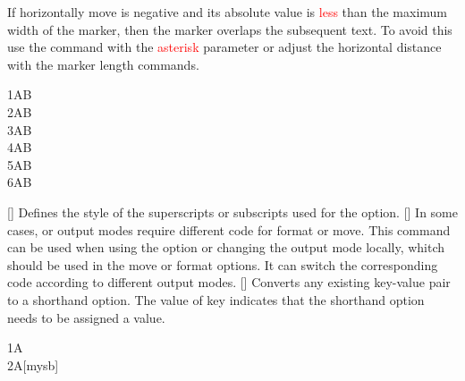 \documentclass[load-preamble+]{cnltx-doc}
\renewcommand{\emph}[1]{\textcolor{red}{#1}}
\begin{document}
\begin{commands}
  If horizontally move is negative and its absolute value is \emph{less} than the maximum width of the marker, then the marker overlaps the subsequent text. To avoid this use the command with the \emph{asterisk} parameter or adjust the horizontal distance with the marker length commands.
  \begin{example}
  1AB \\
  2AB \\
  3AB \\
  4AB \\
  5A\hspace{\dimexpr(\llastwd-8pt)}B \\
  6A\hspace{\dimexpr(\maxwd-8pt)}B
  \end{example}
  []
  Defines the style of the superscripts or subscripts used for the  option.
  []
  In some cases,  or  output modes require different code for format or move. This command can be used when using the  option or changing the output mode locally, whitch should be used in the move or format options. It can switch the corresponding code according to different output modes.
  []
  Converts any existing key-value pair to a shorthand option. The value of key  indicates that the shorthand option needs to be assigned a value.
  \begin{example}
  1A \\
  2A[mysb]
  \end{example}
\end{commands}
\end{document}
